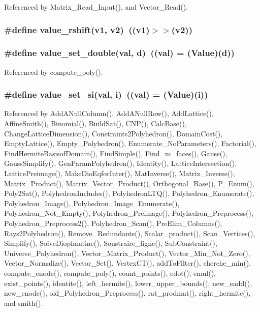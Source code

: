 Referenced by Matrix\_\-Read\_\-Input(), and Vector\_\-Read().

\subsubsection{\setlength{\rightskip}{0pt plus 5cm}\#define value\_\-rshift(v1, v2)\ ((v1)$>$$>$(v2))}\label{arithmetique_8h_a42}


\subsubsection{\setlength{\rightskip}{0pt plus 5cm}\#define value\_\-set\_\-double(val, d)\ ((val) = (Value)(d))}\label{arithmetique_8h_a13}




Referenced by compute\_\-poly().

\subsubsection{\setlength{\rightskip}{0pt plus 5cm}\#define value\_\-set\_\-si(val, i)\ ((val) = (Value)(i))}\label{arithmetique_8h_a12}




Referenced by Add\-ANull\-Column(), Add\-ANull\-Row(), Add\-Lattice(), Affine\-Smith(), Binomial(), Build\-Sat(), CNP(), Calc\-Base(), Change\-Lattice\-Dimension(), Constraints2Polyhedron(), Domain\-Cost(), Empty\-Lattice(), Empty\_\-Polyhedron(), Enumerate\_\-No\-Parameters(), Factorial(), Find\-Hermite\-Basisof\-Domain(), Find\-Simple(), Find\_\-m\_\-faces(), Gauss(), Gauss\-Simplify(), Gen\-Param\-Polyhedron(), Identity(), Lattice\-Intersection(), Lattice\-Preimage(), Make\-Dio\-Eqfor\-Inter(), Mat\-Inverse(), Matrix\_\-Inverse(), Matrix\_\-Product(), Matrix\_\-Vector\_\-Product(), Orthogonal\_\-Base(), P\_\-Enum(), Poly2Sat(), Polyhedron\-Includes(), Polyhedron\-LTQ(), Polyhedron\_\-Enumerate(), Polyhedron\_\-Image(), Polyhedron\_\-Image\_\-Enumerate(), Polyhedron\_\-Not\_\-Empty(), Polyhedron\_\-Preimage(), Polyhedron\_\-Preprocess(), Polyhedron\_\-Preprocess2(), Polyhedron\_\-Scan(), Pre\-Elim\_\-Columns(), Rays2Polyhedron(), Remove\_\-Redundants(), Scalar\_\-product(), Scan\_\-Vertices(), Simplify(), Solve\-Diophantine(), Soustraire\_\-ligne(), Sub\-Constraint(), Universe\_\-Polyhedron(), Vector\_\-Matrix\_\-Product(), Vector\_\-Min\_\-Not\_\-Zero(), Vector\_\-Normalize(), Vector\_\-Set(), Vertex\-CT(), add\-To\-Filter(), cherche\_\-min(), compute\_\-enode(), compute\_\-poly(), count\_\-points(), edot(), emul(), exist\_\-points(), identite(), left\_\-hermite(), lower\_\-upper\_\-bounds(), new\_\-eadd(), new\_\-enode(), old\_\-Polyhedron\_\-Preprocess(), rat\_\-prodmat(), right\_\-hermite(), and smith().

